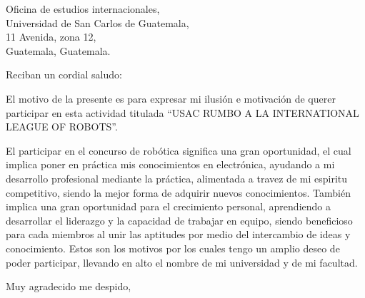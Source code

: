 \documentclass[12pt,letterpaper]{letter}
\date{Guatemala, 7 de junio de 2021.}
\begin{document}
\begin{letter}{
Oficina de estudios internacionales,\\
Universidad de San Carlos de Guatemala,\\
11 Avenida, zona 12,\\
Guatemala, Guatemala.
}

\opening{
Reciban un cordial saludo:
}

El motivo de la presente es para expresar mi ilusión e motivación de querer participar en esta actividad titulada “USAC RUMBO A LA INTERNATIONAL LEAGUE OF ROBOTS”.


El participar en el concurso de robótica significa una gran oportunidad, el cual implica poner en práctica mis conocimientos en electrónica, ayudando a mi desarrollo profesional mediante la práctica, alimentada a travez de mi espiritu competitivo, siendo la mejor forma de adquirir nuevos conocimientos. También implica una gran oportunidad para el crecimiento personal, aprendiendo a desarrollar el liderazgo y la capacidad de trabajar en equipo, siendo beneficioso para cada miembros al unir las aptitudes por medio del intercambio de ideas y conocimiento. Estos son los motivos por los cuales tengo un amplio deseo de poder participar, llevando en alto el nombre de mi universidad y de mi facultad.



\closing{
Muy agradecido me despido,}


         

\end{letter}
\end{document}
